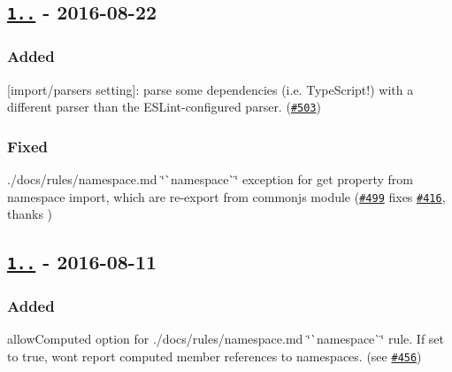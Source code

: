 \subsection*{\href{https://github.com/benmosher/eslint-plugin-import/compare/v1.13.0...v1.14.0}{\tt 1..} -\/ 2016-\/08-\/22}

\subsubsection*{Added}


\begin{DoxyItemize}
\item \mbox{[}{\ttfamily import/parsers} setting\mbox{]}\+: parse some dependencies (i.\+e. Type\+Script!) with a different parser than the E\+S\+Lint-\/configured parser. (\href{https://github.com/benmosher/eslint-plugin-import/pull/503}{\tt \#503})
\end{DoxyItemize}

\subsubsection*{Fixed}


\begin{DoxyItemize}
\item ./docs/rules/namespace.md \char`\"{}\`{}namespace\`{}\char`\"{} exception for get property from {\ttfamily namespace} import, which are re-\/export from commonjs module (\href{https://github.com/benmosher/eslint-plugin-import/pull/499}{\tt \#499} fixes \href{https://github.com/benmosher/eslint-plugin-import/issues/416}{\tt \#416}, thanks \href{https://github.com/wKich}{\tt })
\end{DoxyItemize}

\subsection*{\href{https://github.com/benmosher/eslint-plugin-import/compare/v1.12.0...v1.13.0}{\tt 1..} -\/ 2016-\/08-\/11}

\subsubsection*{Added}


\begin{DoxyItemize}
\item {\ttfamily allow\+Computed} option for ./docs/rules/namespace.md \char`\"{}\`{}namespace\`{}\char`\"{} rule. If set to {\ttfamily true}, won\textquotesingle{}t report computed member references to namespaces. (see \href{https://github.com/benmosher/eslint-plugin-import/issues/456}{\tt \#456})
\end{DoxyItemize}

